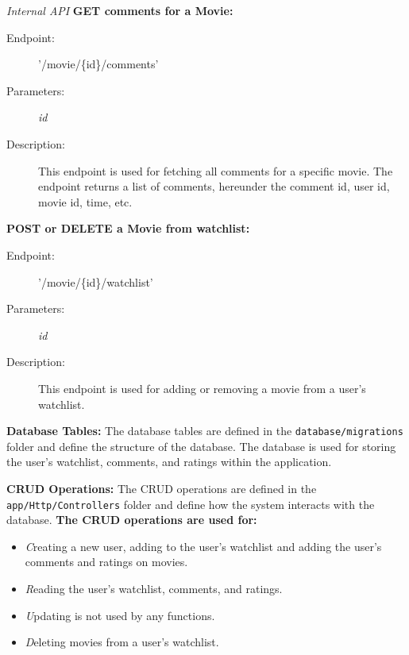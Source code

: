 \textit{Internal API}
\textbf{\newline GET comments for a Movie:}
\begin{description}
    \item [Endpoint:] '/movie/\{id\}/comments'
    \item [Parameters:] \textit{id}
    \item [Description:] This endpoint is used for fetching all comments for a specific movie. The endpoint returns a list of comments, hereunder the comment id, user id, movie id, time, etc.
\end{description}
\textbf{POST or DELETE a Movie from watchlist:}
\begin{description}
    \item [Endpoint:] '/movie/\{id\}/watchlist'
    \item [Parameters:] \textit{id}
    \item [Description:] This endpoint is used for adding or removing a movie from a user's watchlist.
\end{description}

\textbf{Database Tables:}
The database tables are defined in the \texttt{database/migrations} folder and define the structure of the database. The database is used for storing the user's watchlist, comments, and ratings within the application.

\textbf{CRUD Operations:}
The CRUD operations are defined in the \texttt{app/Http/Controllers} folder and define how the system interacts with the database.
\textbf{The CRUD operations are used for:}
\begin{itemize}
    \item \textit{C}reating a new user, adding to the user's watchlist and adding the user's comments and ratings on movies.
    \item \textit{R}eading the user's watchlist, comments, and ratings.
    \item \textit{U}pdating is not used by any functions.
    \item \textit{D}eleting movies from a user's watchlist.
\end{itemize}
